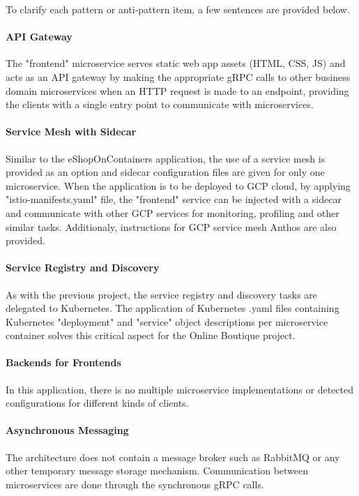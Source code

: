\documentclass{Configuration_Files/PoliMi3i_thesis}
\begin{document}
To clarify each pattern or anti-pattern item, a few sentences are provided below.

\paragraph{API Gateway} The "frontend" microservice serves static web app assets (HTML, CSS, JS) and acts as an API gateway by making the appropriate gRPC calls to other business domain microservices when an HTTP request is made to an endpoint, providing the clients with a single entry point to communicate with microservices.

\paragraph{Service Mesh with Sidecar} Similar to the eShopOnContainers application, the use of a service mesh is provided as an option and sidecar configuration files are given for only one microservice.
When the application is to be deployed to GCP cloud, by applying "istio-manifests.yaml" file, the "frontend" service can be injected with a sidecar and communicate with other GCP services for monitoring, profiling and other similar tasks. 
Additionaly, instructions for GCP service mesh Anthos\footnotemark[72] are also provided.

\paragraph{Service Registry and Discovery} As with the previous project, the service registry and discovery tasks are delegated to Kubernetes.
The application of Kubernetes .yaml files containing Kubernetes "deployment" and "service" object descriptions per microservice container solves this critical aspect for the Online Boutique project.

\paragraph{Backends for Frontends} In this application, there is no multiple microservice implementations or detected configurations for different kinds of clients.

\paragraph{Asynchronous Messaging} The architecture does not contain a message broker such as RabbitMQ or any other temporary message storage mechanism.
Communication between microservices are done through the synchronous gRPC calls.
\end{document}
